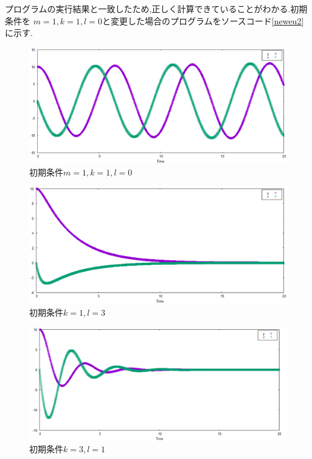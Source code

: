 プログラムの実行結果と一致したため,正しく計算できていることがわかる.初期条件を
$m=1,k=1,l=0$と変更した場合のプログラムをソースコード\ref{neweu2}に示す.

\begin{figure}[htbp]
\centering
\includegraphics[scale=0.5]{./img/kadai6_1mkl_110.eps}
\caption{初期条件$m=1,k=1,l=0$}
\label{101837_6Jan19}
\end{figure}
\begin{figure}[htbp]
\centering
\includegraphics[scale=0.5]{./img/kadai6_2mkl_113.eps}
\caption{初期条件$k=1,l=3$}
\label{mkl113}
\end{figure}
\begin{figure}[htbp]
\centering
\includegraphics[scale=0.5]{./img/kadai6_3mkl_131.eps}
\caption{初期条件$k=3,l=1$}
\label{mkl131}
\end{figure}

